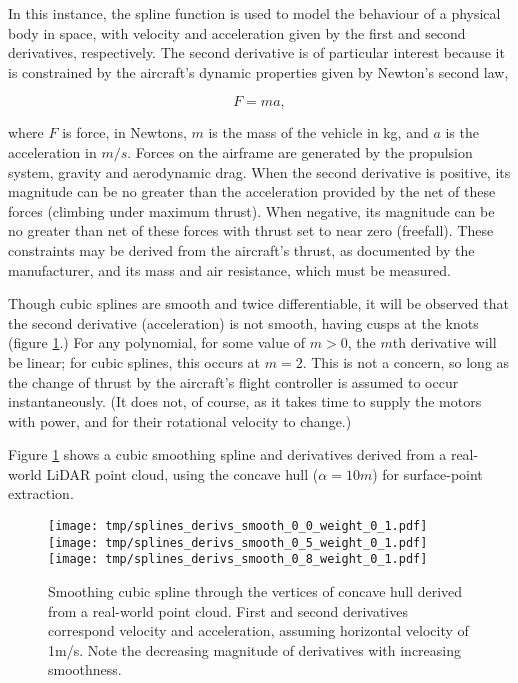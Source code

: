 \documentclass[doc]{apa6}
\begin{document}
In this instance, the spline function is used to model the behaviour of a physical body in space, with velocity and acceleration given by the first and second derivatives, respectively. The second derivative is of particular interest because it is constrained by the aircraft's dynamic properties given by Newton's second law,

\begin{equation}
F = ma,
\end{equation} 

where $F$ is force, in Newtons, $m$ is the mass of the vehicle in kg, and $a$ is the acceleration in $m/s$. Forces on the airframe are generated by the propulsion system, gravity and aerodynamic drag. When the second derivative is positive, its magnitude can be no greater than the acceleration provided by the net of these forces (climbing under maximum thrust). When negative, its magnitude can be no greater than net of these forces with thrust set to near zero (freefall). These constraints may be derived from the aircraft's thrust, as documented by the manufacturer, and its mass and air resistance, which must be measured. 

Though cubic splines are smooth and twice differentiable, it will be observed that the second derivative (acceleration) is not smooth, having cusps at the knots (figure \ref{fig:cubic_derivatives}.) For any polynomial, for some value of $m > 0$, the $m$th derivative will be linear; for cubic splines, this occurs at $m = 2$. This is not a concern, so long as the change of thrust by the aircraft's flight controller is assumed to occur instantaneously. (It does not, of course, as it takes time to supply the motors with power, and for their rotational velocity to change.) 

Figure \ref{fig:cubic_derivatives} shows a cubic smoothing spline and derivatives derived from a real-world LiDAR point cloud, using the concave hull ($\alpha = 10m$) for surface-point extraction.

\begin{figure} %
\texttt{[image: tmp/splines\_derivs\_smooth\_0\_0\_weight\_0\_1.pdf]} 
\texttt{[image: tmp/splines\_derivs\_smooth\_0\_5\_weight\_0\_1.pdf]} 
\texttt{[image: tmp/splines\_derivs\_smooth\_0\_8\_weight\_0\_1.pdf]} 
\caption{Smoothing cubic spline through the vertices of concave hull derived from a real-world point cloud. First and second derivatives correspond velocity and acceleration, assuming horizontal velocity of 1m/s. Note the decreasing magnitude of derivatives with increasing smoothness.}
\label{fig:cubic_derivatives}
\end{figure}
\end{document}
